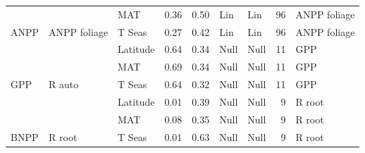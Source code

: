 \documentclass[
]{article}
\begin{document}
\begin{landscape}
\begin{table}[!h]
{\begin{tabular}[t]{lllrrllrl}
 &  & MAT & 0.36 & 0.50 & Lin & Lin & 96 & ANPP foliage\\

\multirow{-6}{*}{\raggedright\arraybackslash ANPP} & \multirow{-3}{*}{\raggedright\arraybackslash ANPP foliage} & T Seas & 0.27 & 0.42 & Lin & Lin & 96 & ANPP foliage\\
\cmidrule{1-9}
 &  & Latitude & 0.64 & 0.34 & Null & Null & 11 & GPP\\

 &  & MAT & 0.69 & 0.34 & Null & Null & 11 & GPP\\

\multirow{-3}{*}{\raggedright\arraybackslash GPP} & \multirow{-3}{*}{\raggedright\arraybackslash R auto} & T Seas & 0.64 & 0.32 & Null & Null & 11 & GPP\\
\cmidrule{1-9}
 &  & Latitude & 0.01 & 0.39 & Null & Null & 9 & R root\\

 &  & MAT & 0.08 & 0.35 & Null & Null & 9 & R root\\

\multirow{-3}{*}{\raggedright\arraybackslash BNPP} & \multirow{-3}{*}{\raggedright\arraybackslash R root} & T Seas & 0.01 & 0.63 & Null & Null & 9 & R root\\
\bottomrule
\end{tabular}}
\end{table}
\end{landscape}
\end{document}
